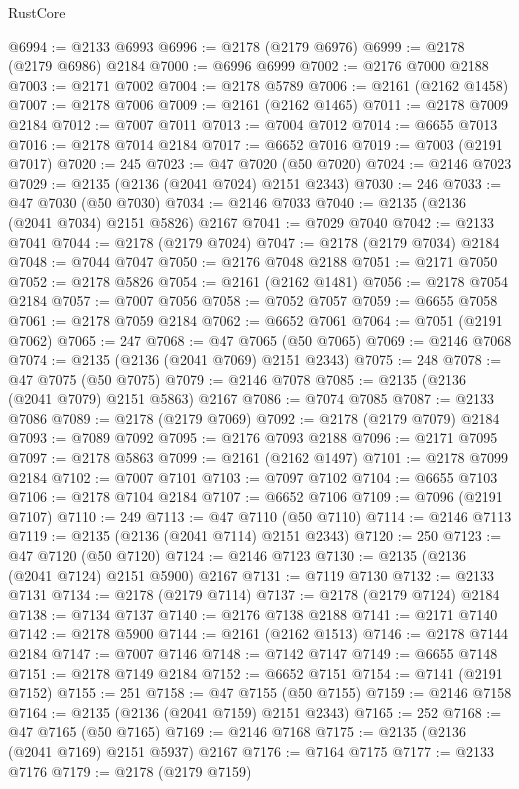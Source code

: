 \begin{lexlean}{RustCore}
\begin{coremodule}
@6994 := @2133 @6993
@6996 := @2178 (@2179 @6976)
@6999 := @2178 (@2179 @6986) @2184
@7000 := @6996 @6999
@7002 := @2176 @7000 @2188
@7003 := @2171 @7002
@7004 := @2178 @5789
@7006 := @2161 (@2162 @1458)
@7007 := @2178 @7006
@7009 := @2161 (@2162 @1465)
@7011 := @2178 @7009 @2184
@7012 := @7007 @7011
@7013 := @7004 @7012
@7014 := @6655 @7013
@7016 := @2178 @7014 @2184
@7017 := @6652 @7016
@7019 := @7003 (@2191 @7017)
@7020 := 245
@7023 := @47 @7020 (@50 @7020)
@7024 := @2146 @7023
@7029 := @2135 (@2136 (@2041 @7024) @2151 @2343)
@7030 := 246
@7033 := @47 @7030 (@50 @7030)
@7034 := @2146 @7033
@7040 := @2135 (@2136 (@2041 @7034) @2151 @5826) @2167
@7041 := @7029 @7040
@7042 := @2133 @7041
@7044 := @2178 (@2179 @7024)
@7047 := @2178 (@2179 @7034) @2184
@7048 := @7044 @7047
@7050 := @2176 @7048 @2188
@7051 := @2171 @7050
@7052 := @2178 @5826
@7054 := @2161 (@2162 @1481)
@7056 := @2178 @7054 @2184
@7057 := @7007 @7056
@7058 := @7052 @7057
@7059 := @6655 @7058
@7061 := @2178 @7059 @2184
@7062 := @6652 @7061
@7064 := @7051 (@2191 @7062)
@7065 := 247
@7068 := @47 @7065 (@50 @7065)
@7069 := @2146 @7068
@7074 := @2135 (@2136 (@2041 @7069) @2151 @2343)
@7075 := 248
@7078 := @47 @7075 (@50 @7075)
@7079 := @2146 @7078
@7085 := @2135 (@2136 (@2041 @7079) @2151 @5863) @2167
@7086 := @7074 @7085
@7087 := @2133 @7086
@7089 := @2178 (@2179 @7069)
@7092 := @2178 (@2179 @7079) @2184
@7093 := @7089 @7092
@7095 := @2176 @7093 @2188
@7096 := @2171 @7095
@7097 := @2178 @5863
@7099 := @2161 (@2162 @1497)
@7101 := @2178 @7099 @2184
@7102 := @7007 @7101
@7103 := @7097 @7102
@7104 := @6655 @7103
@7106 := @2178 @7104 @2184
@7107 := @6652 @7106
@7109 := @7096 (@2191 @7107)
@7110 := 249
@7113 := @47 @7110 (@50 @7110)
@7114 := @2146 @7113
@7119 := @2135 (@2136 (@2041 @7114) @2151 @2343)
@7120 := 250
@7123 := @47 @7120 (@50 @7120)
@7124 := @2146 @7123
@7130 := @2135 (@2136 (@2041 @7124) @2151 @5900) @2167
@7131 := @7119 @7130
@7132 := @2133 @7131
@7134 := @2178 (@2179 @7114)
@7137 := @2178 (@2179 @7124) @2184
@7138 := @7134 @7137
@7140 := @2176 @7138 @2188
@7141 := @2171 @7140
@7142 := @2178 @5900
@7144 := @2161 (@2162 @1513)
@7146 := @2178 @7144 @2184
@7147 := @7007 @7146
@7148 := @7142 @7147
@7149 := @6655 @7148
@7151 := @2178 @7149 @2184
@7152 := @6652 @7151
@7154 := @7141 (@2191 @7152)
@7155 := 251
@7158 := @47 @7155 (@50 @7155)
@7159 := @2146 @7158
@7164 := @2135 (@2136 (@2041 @7159) @2151 @2343)
@7165 := 252
@7168 := @47 @7165 (@50 @7165)
@7169 := @2146 @7168
@7175 := @2135 (@2136 (@2041 @7169) @2151 @5937) @2167
@7176 := @7164 @7175
@7177 := @2133 @7176
@7179 := @2178 (@2179 @7159)

\end{coremodule}
\end{lexlean}
